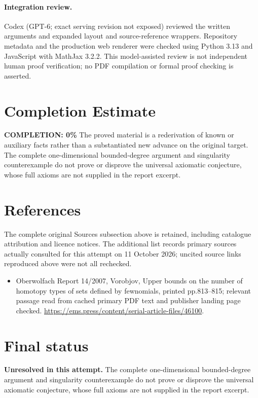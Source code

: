 \documentclass[11pt]{article}
\begin{document}
\paragraph{Integration review.} Codex (GPT-6; exact serving revision not exposed) reviewed the written arguments and expanded layout and source-reference wrappers. Repository metadata and the production web renderer were checked using Python 3.13 and JavaScript with MathJax 3.2.2. This model-assisted review is not independent human proof verification; no PDF compilation or formal proof checking is asserted.

\section{Completion Estimate}
\noindent\textbf{COMPLETION: 0\%}
The proved material is a rederivation of known or auxiliary facts rather than a substantiated new advance on the original target. The complete one-dimensional bounded-degree argument and singularity counterexample do not prove or disprove the universal axiomatic conjecture, whose full axioms are not supplied in the report excerpt.
\section{References}
The complete original Sources subsection above is retained, including catalogue attribution and licence notices. The additional list records primary sources actually consulted for this attempt on 11 October 2026; uncited source links reproduced above were not all rechecked.
\begin{itemize}
\item Oberwolfach Report 14/2007, Vorobjov, Upper bounds on the number of homotopy types of sets defined by fewnomials, printed pp.813--815; relevant passage read from cached primary PDF text and publisher landing page checked. \url{https://ems.press/content/serial-article-files/46100}.
\end{itemize}
\section{Final status}
\textbf{Unresolved in this attempt.} The complete one-dimensional bounded-degree argument and singularity counterexample do not prove or disprove the universal axiomatic conjecture, whose full axioms are not supplied in the report excerpt.
\end{document}
